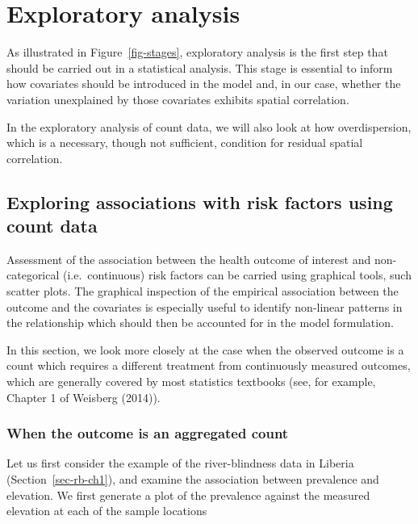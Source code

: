 \documentclass[
  letterpaper,
]{krantz}
\begin{document}
\hypertarget{exploratory-analysis}{%
\section{Exploratory analysis}\label{exploratory-analysis}}

As illustrated in Figure~\ref{fig-stages}, exploratory analysis is the
first step that should be carried out in a statistical analysis. This
stage is essential to inform how covariates should be introduced in the
model and, in our case, whether the variation unexplained by those
covariates exhibits spatial correlation.

In the exploratory analysis of count data, we will also look at how
overdispersion, which is a necessary, though not sufficient, condition
for residual spatial correlation.

\hypertarget{sec-expl-assoc}{%
\subsection{Exploring associations with risk factors using count
data}\label{sec-expl-assoc}}

Assessment of the association between the health outcome of interest and
non-categorical (i.e.~continuous) risk factors can be carried using
graphical tools, such scatter plots. The graphical inspection of the
empirical association between the outcome and the covariates is
especially useful to identify non-linear patterns in the relationship
which should then be accounted for in the model formulation.

In this section, we look more closely at the case when the observed
outcome is a count which requires a different treatment from
continuously measured outcomes, which are generally covered by most
statistics textbooks (see, for example, Chapter 1 of Weisberg (2014)).

\hypertarget{sec-agg-count-exp}{%
\subsubsection{When the outcome is an aggregated
count}\label{sec-agg-count-exp}}

Let us first consider the example of the river-blindness data in Liberia
(Section~\ref{sec-rb-ch1}), and examine the association between
prevalence and elevation. We first generate a plot of the prevalence
against the measured elevation at each of the sample locations
\end{document}
